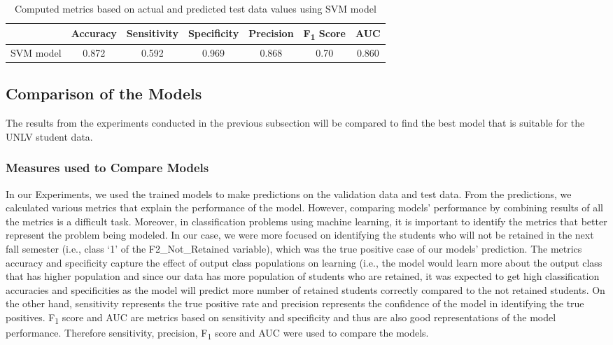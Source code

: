 \documentclass[11pt,openright]{report}
\begin{document}
\begin{table}[!htb]
	\renewcommand{\arraystretch}{1.3}
	\caption{Computed metrics based on actual and predicted test data values using SVM model}
	\label{table:SVM-unseen_metrics_db}
	\centering
	\begin{tabular}{|c|c|c|c|c|c|c|}
    \hline
  	 & \bfseries Accuracy & \bfseries Sensitivity & \bfseries Specificity & \bfseries Precision & \bfseries F\textsubscript{1} Score  & \bfseries AUC\\  
    \hline
	SVM model & 0.872 & 0.592 & 0.969 & 0.868 & 0.70 & 0.860 \\ \hline
	\end{tabular} 
\end{table}


\subsection {Comparison of the Models}

The results from the experiments conducted in the previous subsection will be compared to find the best model that is suitable for the UNLV student data. 

\subsubsection {Measures used to Compare Models}

In our Experiments, we used the trained models to make predictions on the validation data and test data. From the predictions, we calculated various metrics that explain the performance of the model. However, comparing models' performance by combining results of all the metrics is a difficult task. Moreover, in classification problems using machine learning, it is important to identify the metrics that better represent the problem being modeled. In our case, we were more focused on identifying the students who will not be retained in the next fall semester (i.e., class `1' of the F2\_Not\_Retained variable), which was the true positive case of our models' prediction. The metrics accuracy and specificity capture the effect of output class populations on learning (i.e., the model would learn more about the output class that has higher population and since our data has more population of students who are retained, it was expected to get high classification accuracies and specificities as the model will predict more number of retained students correctly compared to the not retained students. On the other hand, sensitivity represents the true positive rate and precision represents the confidence of the model in identifying the true positives. F\textsubscript{1} score and AUC are metrics based on sensitivity and specificity and thus are also good representations of the model performance. Therefore sensitivity, precision, F\textsubscript{1} score and AUC were used to compare the models.
\end{document}
